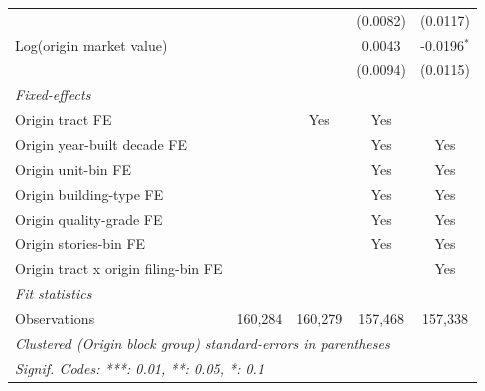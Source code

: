 \begin{tabular}{lcccc}
                                                  &                       &               & (0.0082)        & (0.0117)\\   
   Log(origin market value)                       &                       &               & 0.0043          & -0.0196$^{*}$\\   
                                                  &                       &               & (0.0094)        & (0.0115)\\   
   \midrule
   \emph{Fixed-effects}\\
   Origin tract FE                                &                       & Yes           & Yes             & \\  
   Origin year-built decade FE                    &                       &               & Yes             & Yes\\  
   Origin unit-bin FE                             &                       &               & Yes             & Yes\\  
   Origin building-type FE                        &                       &               & Yes             & Yes\\  
   Origin quality-grade FE                        &                       &               & Yes             & Yes\\  
   Origin stories-bin FE                          &                       &               & Yes             & Yes\\  
   Origin tract x origin filing-bin FE            &                       &               &                 & Yes\\  
   \midrule
   \emph{Fit statistics}\\
   Observations                                   & 160,284               & 160,279       & 157,468         & 157,338\\  
   \midrule \midrule
   \multicolumn{5}{l}{\emph{Clustered (Origin block group) standard-errors in parentheses}}\\
   \multicolumn{5}{l}{\emph{Signif. Codes: ***: 0.01, **: 0.05, *: 0.1}}\\
\end{tabular}
\par\endgroup
